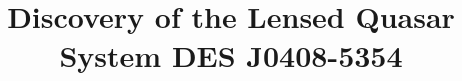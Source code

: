\documentclass[twocolumn]{aastex6}
\begin{document}

\def \sysname {DES J0408-5354}

\title{Discovery of the Lensed Quasar System \sysname}




\def\andname{}
\end{document}
